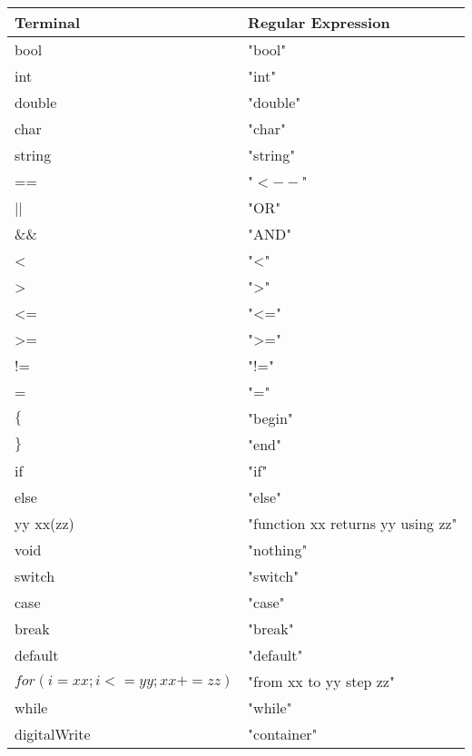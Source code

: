 \begin{tabular}{l l}
\item Terminal & Regular Expression \\ \hline
\item bool & "bool" \\
\item int & "int" \\
\item double & "double"\\
\item char & "char" \\
\item string & "string" \\
\item == & "$<--$" \\ 
\item || & "OR" \\
\item \&\& & "AND" \\
\item < & "<" \\
\item > & ">" \\
\item <= & "<=" \\
\item >= & ">=" \\
\item != & "!=" \\
\item = & "=" \\ 
\item $\{$ & "begin"\\
\item $\}$ & "end"\\
\item if & "if" \\
\item else & "else" \\
\item yy xx(zz) & "function xx returns yy using zz" \\
\item void & "nothing" \\
\item switch & "switch" \\
\item case & "case" \\
\item break & "break" \\
\item default & "default" \\
\item $for(i=xx; i<=yy; xx+=zz)$ & "from xx to yy step zz" \\
\item while & "while" \\
\item digitalWrite & "container" \\



\end{tabular}
